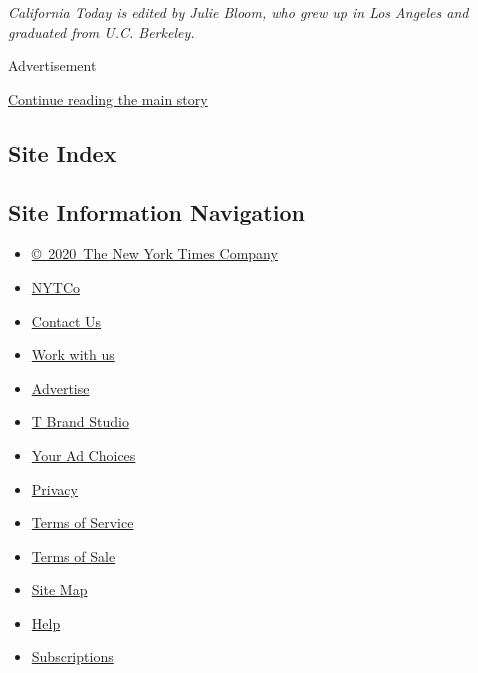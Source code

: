 \emph{California Today is edited by Julie Bloom, who grew up in Los
Angeles and graduated from U.C. Berkeley.}

Advertisement

\protect\hyperlink{after-bottom}{Continue reading the main story}

\hypertarget{site-index}{%
\subsection{Site Index}\label{site-index}}

\hypertarget{site-information-navigation}{%
\subsection{Site Information
Navigation}\label{site-information-navigation}}

\begin{itemize}
\tightlist
\item
  \href{https://help.nytimes.com/hc/en-us/articles/115014792127-Copyright-notice}{©~2020~The
  New York Times Company}
\end{itemize}

\begin{itemize}
\tightlist
\item
  \href{https://www.nytco.com/}{NYTCo}
\item
  \href{https://help.nytimes.com/hc/en-us/articles/115015385887-Contact-Us}{Contact
  Us}
\item
  \href{https://www.nytco.com/careers/}{Work with us}
\item
  \href{https://nytmediakit.com/}{Advertise}
\item
  \href{http://www.tbrandstudio.com/}{T Brand Studio}
\item
  \href{https://www.nytimes.com/privacy/cookie-policy\#how-do-i-manage-trackers}{Your
  Ad Choices}
\item
  \href{https://www.nytimes.com/privacy}{Privacy}
\item
  \href{https://help.nytimes.com/hc/en-us/articles/115014893428-Terms-of-service}{Terms
  of Service}
\item
  \href{https://help.nytimes.com/hc/en-us/articles/115014893968-Terms-of-sale}{Terms
  of Sale}
\item
  \href{https://spiderbites.nytimes.com}{Site Map}
\item
  \href{https://help.nytimes.com/hc/en-us}{Help}
\item
  \href{https://www.nytimes.com/subscription?campaignId=37WXW}{Subscriptions}
\end{itemize}
